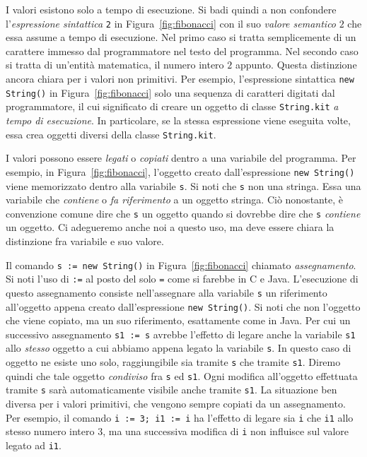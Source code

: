 %
I valori esistono solo a tempo di esecuzione. Si badi quindi a non confondere
l'\emph{espressione sintattica} \texttt{2} in Figura~\ref{fig:fibonacci} con il
suo \emph{valore semantico} $2$ che essa assume a tempo di esecuzione. Nel
primo caso si tratta semplicemente di un carattere immesso dal programmatore
nel testo del programma. Nel secondo caso si tratta di un'entit\`a matematica,
il numero intero $2$ appunto. Questa distinzione \e ancora \piu chiara per
i valori non primitivi. Per esempio, l'espressione sintattica
\texttt{new String()} in Figura~\ref{fig:fibonacci} \e solo una sequenza
di caratteri digitati dal programmatore, il cui significato \e di creare
un oggetto di classe \texttt{String.kit} \emph{a tempo di esecuzione}.
In particolare, se la stessa espressione viene eseguita \piu volte,
essa crea \piu oggetti diversi della classe \texttt{String.kit}.
%

I valori possono essere \emph{legati} o \emph{copiati} dentro a una variabile
del programma. Per esempio, in Figura~\ref{fig:fibonacci}, l'oggetto creato
dall'espressione \texttt{new String()} viene memorizzato dentro alla variabile
\texttt{s}. Si noti che \texttt{s} non \e una stringa. Essa \e una variabile
che \emph{contiene} o \emph{fa riferimento} a un oggetto stringa.
Ci\`o nonostante, \`e convenzione comune
dire che \texttt{s} \emph{\e} un oggetto quando
si dovrebbe dire che \texttt{s} \emph{contiene} un oggetto. Ci adegueremo anche
noi a questo uso, ma deve essere chiara la distinzione fra variabile e
suo valore.

Il comando \texttt{s := new String()} in Figura~\ref{fig:fibonacci} \e
chiamato \emph{assegnamento}. Si noti l'uso di \texttt{:=} al posto del
solo \texttt{=} come si farebbe in C e Java. L'esecuzione di questo
assegnamento consiste nell'assegnare alla variabile \texttt{s} un riferimento
all'oggetto appena creato dall'espressione \texttt{new String()}.
Si noti che non \e l'oggetto che viene copiato, ma un suo riferimento,
esattamente come in Java. Per cui un successivo assegnamento
\texttt{s1 := s} avrebbe l'effetto di legare anche la variabile
\texttt{s1} allo \emph{stesso} oggetto a cui abbiamo appena legato
la variabile \texttt{s}. In questo caso di oggetto ne esiste uno solo,
raggiungibile sia tramite \texttt{s} che tramite \texttt{s1}. Diremo quindi
che tale oggetto \e \emph{condiviso} fra \texttt{s} ed \texttt{s1}.
Ogni modifica all'oggetto effettuata tramite \texttt{s} sar\`a automaticamente
visibile anche tramite \texttt{s1}.
La situazione \e ben diversa per i valori primitivi, che vengono sempre copiati
da un assegnamento. Per esempio, il comando
\texttt{i := 3; i1 := i} ha l'effetto di legare sia \texttt{i} che \texttt{i1}
allo stesso numero intero $3$, ma una successiva modifica di \texttt{i}
non influisce sul valore legato ad \texttt{i1}.
%

